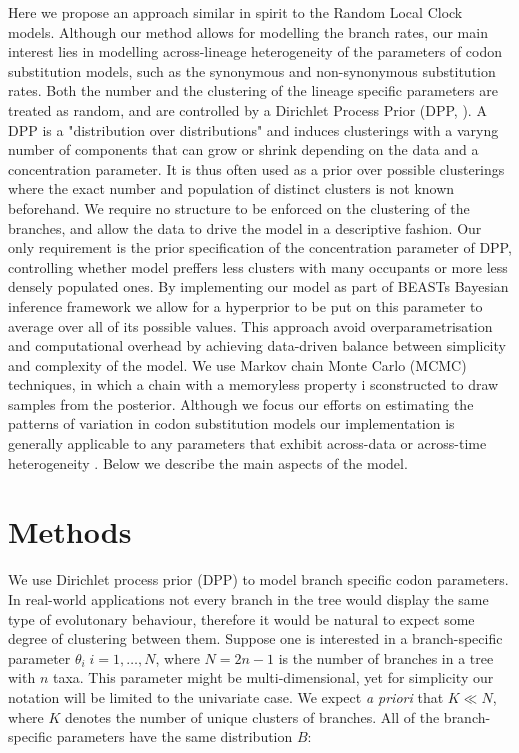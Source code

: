 Here we propose an approach similar in spirit to the Random Local Clock models.
Although our method allows for modelling the branch rates, our main interest lies in modelling across-lineage heterogeneity of the parameters of codon substitution models, such as the synonymous and non-synonymous substitution rates.
Both the number and the clustering of the lineage specific parameters are treated as random, and are controlled by a Dirichlet Process Prior (DPP, \citet{Ferguson1973}).
A DPP is a "distribution over distributions" and induces clusterings with a varyng number of components that can grow or shrink depending on the data and a concentration parameter.
It is thus often used as a prior over possible clusterings where the exact number and population of distinct clusters is not known beforehand.
We require no structure to be enforced on the clustering of the branches, and allow the data to drive the model in a descriptive fashion. 
Our only requirement is the prior specification of the concentration parameter of DPP, controlling whether model preffers less clusters with many occupants or more less densely populated ones. 
By implementing our model as part of BEASTs Bayesian inference framework we allow for a hyperprior to be put on this parameter to average over all of its possible values. 
This approach avoid overparametrisation and computational overhead by achieving data-driven balance between simplicity and complexity of the model.
We use Markov chain Monte Carlo (MCMC) techniques, in which a chain with a memoryless property i sconstructed to draw samples from the posterior.
Although we focus our efforts on estimating the patterns of variation in codon substitution models our implementation is generally applicable to any parameters that exhibit across-data or across-time heterogeneity .
Below we describe the main aspects of the model.

\section{Methods}

We use Dirichlet process prior (DPP) to model branch specific codon parameters.
In real-world applications not every branch in the tree would display the same type of evolutonary behaviour, therefore it would be natural to expect some degree of clustering between them.
Suppose one is interested in a branch-specific parameter $\theta_{i}\;i=1,\ldots,N$, where $N=2n-1$ is the number of branches in a tree with $n$ taxa. 
This parameter might be multi-dimensional, yet for simplicity our notation will be limited to the univariate case.
We expect \emph{a priori} that $K\ll N$, where $K$ denotes the number of unique clusters of branches.
All of the branch-specific parameters have the same distribution $B$:

